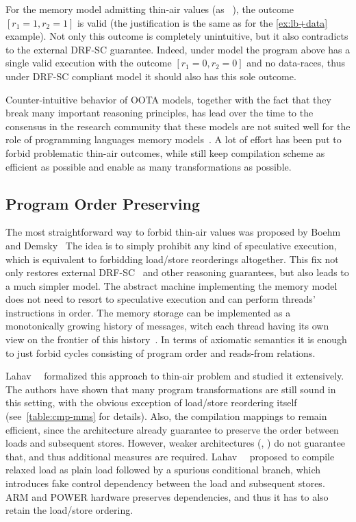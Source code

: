 For the memory model admitting thin-air values 
(as \eg \CMM~\cite{Batty-al:POPL11}), 
the outcome $[r_1=1, r_2=1]$ is valid
(the justification is the same as for the \ref{ex:lb+data} example).
Not only this outcome is completely unintuitive,
but it also contradicts to the external DRF-SC guarantee.
Indeed, under \SC model the program above has 
a single valid execution with the outcome $[r_1=0, r_2=0]$ 
and no data-races, thus under DRF-SC compliant model 
it should also has this sole outcome.  

Counter-intuitive behavior of OOTA models, together with the fact that they break 
many important reasoning principles,
has lead over the time to the consensus in the research community that these models 
are not suited well for the role of 
programming languages memory models~\cite{Boehm-Demsky:MSPC14, Batty-al:ESOP15}.
A lot of effort has been put to forbid problematic 
thin-air outcomes, while still keep compilation scheme as efficient as possible
and enable as many transformations as possible.

\subsection{Program Order Preserving}
\label{sec:analysis:porf}

The most straightforward way to forbid thin-air values 
was proposed by Boehm and Demsky~\cite{Boehm-Demsky:MSPC14}
The idea is to simply prohibit any kind of speculative execution, 
which is equivalent to forbidding load/store reorderings altogether. 
This fix not only restores external DRF-SC~\cite{Lahav-al:PLDI17}
and other reasoning guarantees, but also leads to 
a much simpler model. The abstract machine implementing 
the memory model does not need to resort to speculative execution 
and can perform threads' instructions in order. 
The memory storage can be implemented as a 
monotonically growing history of messages, 
witch each thread having its own view on 
the frontier of this history~\cite{Dolan-al:PLDI18, Doherty-al:PPoPP19}.
In terms of axiomatic semantics it is enough to just
forbid cycles consisting of program order and reads-from relations. 

Lahav~\etal~\cite{Lahav-al:PLDI17} formalized this approach
to thin-air problem and studied it extensively. 
The authors have shown that many 
program transformations are still sound in this setting, 
with the obvious exception of load/store reordering itself
(see~\cref{table:cmp-mms} for details).
Also, the compilation mappings to \xTSO remain efficient, 
since the architecture already guarantee to preserve the order 
between loads and subsequent stores. 
However, weaker architectures (\ARM, \POWER) do not guarantee that, 
and thus additional measures are required.
Lahav~\etal~\cite{Lahav-al:PLDI17} proposed to compile relaxed load 
as plain load followed by a spurious conditional branch,
which introduces fake control dependency between 
the load and subsequent stores. 
ARM and POWER hardware preserves dependencies, 
and thus it has to also retain the load/store ordering. 

